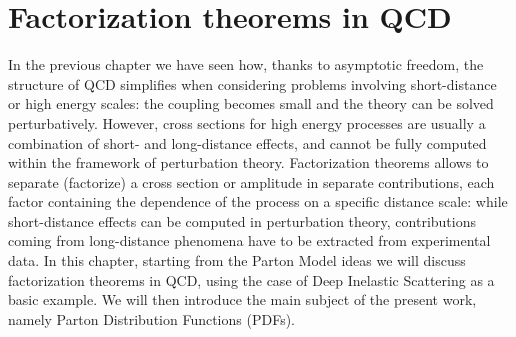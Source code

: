 \chapter{Factorization theorems in QCD}
\label{ch:fact}
In the previous chapter we have seen how, thanks to asymptotic freedom, the structure of QCD simplifies when considering problems
involving short-distance or high energy scales: the coupling becomes small and the theory can be solved perturbatively.
However, cross sections for high energy processes are usually a combination of short- and long-distance effects, and cannot
be fully computed within the framework of perturbation theory. Factorization theorems allows to separate (factorize) a cross section
or amplitude in separate contributions, each factor containing the dependence of the process on a specific distance scale:
while short-distance effects can be computed in perturbation theory, contributions coming from long-distance phenomena have
to be extracted from experimental data. 
In this chapter, starting from the Parton Model ideas we will discuss factorization theorems in QCD,
using the case of Deep Inelastic Scattering as a basic example. We will then introduce the main subject of the
present work, namely Parton Distribution Functions (PDFs).

